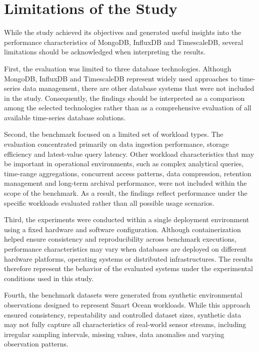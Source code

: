\section{Limitations of the Study}
While the study achieved its objectives and generated useful insights into the performance characteristics of MongoDB, InfluxDB and TimescaleDB, several limitations should be acknowledged when interpreting the results.


First, the evaluation was limited to three database technologies. Although MongoDB, InfluxDB and TimescaleDB represent widely used approaches to time-series data management, there are other database systems that were not included in the study. Consequently, the findings should be interpreted as a comparison among the selected technologies rather than as a comprehensive evaluation of all available time-series database solutions.


Second, the benchmark focused on a limited set of workload types. The evaluation concentrated primarily on data ingestion performance, storage efficiency and latest-value query latency. Other workload characteristics that may be important in operational environments, such as complex analytical queries, time-range aggregations, concurrent access patterns, data compression, retention management and long-term archival performance, were not included within the scope of the benchmark. As a result, the findings reflect performance under the specific workloads evaluated rather than all possible usage scenarios.


Third, the experiments were conducted within a single deployment environment using a fixed hardware and software configuration. Although containerization helped ensure consistency and reproducibility across benchmark executions, performance characteristics may vary when databases are deployed on different hardware platforms, operating systems or distributed infrastructures. The results therefore represent the behavior of the evaluated systems under the experimental conditions used in this study.

Fourth, the benchmark datasets were generated from synthetic environmental observations designed to represent Smart Ocean workloads. While this approach ensured consistency, repeatability and controlled dataset sizes, synthetic data may not fully capture all characteristics of real-world sensor streams, including irregular sampling intervals, missing values, data anomalies and varying observation patterns.



